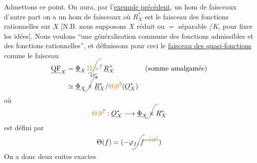 Admettons ce point. On aura, par l'\uline{exemple précédent}, un hom de faisceaux
d'autre part on a un hom de faisceaux
où $R_X^*$ est le faisceau des fonctions rationnelles sur $X$ [N.B. nous supposons $X$ réduit ou $=$ séparable $/K$, pour fixer les idées]. Nous voulons ``une généralisation commune des fonctions admissibles et des fonctions rationnelles'', et définissons pour ceci le \uline{faisceau des quasi-fonctions} comme le faisceau
\[
\begin{aligned}
\underline{\mathrm{QF}}_X&=\underline{\Phi}_X\mathop{\tikz[baseline=(op.base)]{\node[inner sep=0pt] (op) {$\unsure{\amalg|\times}$};\draw[overlay,thin] (-.33,-.22) .. controls (.09,-.33) and (-.04,.48) .. (.35,.49);}}\limits_{O_X^*}\underline R_X^{\times}
&&\text{(somme amalgamée)}\\
&\simeq\underline{\Phi}_X\mathbin{\tikz[baseline=(op.base)]{\node[inner sep=0pt] (op) {$\times$};\draw[overlay,thin] (-.33,-.22) .. controls (.09,-.33) and (-.04,.48) .. (.35,.49);}}\underline R_X^*/\unsure{\Theta|\theta}(\underline O_X^*)
\end{aligned}
\]
où
\[
\unsure{\Theta|\theta}:\underline O_X^*\longrightarrow\underline{\Phi}_X\mathbin{\tikz[baseline=(op.base)]{\node[inner sep=0pt] (op) {$\times$};\draw[overlay,thin] (-.33,-.22) .. controls (.09,-.33) and (-.04,.48) .. (.35,.49);}}R_X^*
\]
est défini par
\[
\Theta(f)=(-\varphi_f\mathpunct{\tikz[baseline=(op.base)]{\node[inner sep=0pt] (op) {$,$};\draw[overlay,thin] (-.33,-.22) .. controls (.09,-.33) and (-.04,.48) .. (.35,.49);}}f^{\deleted{\unsure{-1|1}}})
\]
On a donc deux suites exactes

